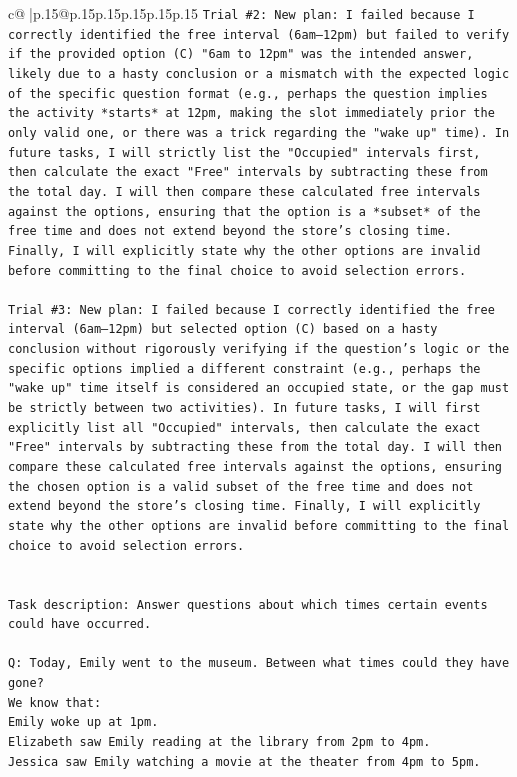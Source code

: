 \documentclass{article}
\begin{document}
{\begin{supertabular}{c@{$\;$}|p{.15\linewidth}@{}p{.15\linewidth}p{.15\linewidth}p{.15\linewidth}p{.15\linewidth}p{.15\linewidth}}
{{{\texttt{Trial \#2: New plan: I failed because I correctly identified the free interval (6am–12pm) but failed to verify if the provided option (C) "6am to 12pm" was the intended answer, likely due to a hasty conclusion or a mismatch with the expected logic of the specific question format (e.g., perhaps the question implies the activity *starts* at 12pm, making the slot immediately prior the only valid one, or there was a trick regarding the "wake up" time). In future tasks, I will strictly list the "Occupied" intervals first, then calculate the exact "Free" intervals by subtracting these from the total day. I will then compare these calculated free intervals against the options, ensuring that the option is a *subset* of the free time and does not extend beyond the store's closing time. Finally, I will explicitly state why the other options are invalid before committing to the final choice to avoid selection errors.} \\
\\ 
\texttt{Trial \#3: New plan: I failed because I correctly identified the free interval (6am–12pm) but selected option (C) based on a hasty conclusion without rigorously verifying if the question's logic or the specific options implied a different constraint (e.g., perhaps the "wake up" time itself is considered an occupied state, or the gap must be strictly between two activities). In future tasks, I will first explicitly list all "Occupied" intervals, then calculate the exact "Free" intervals by subtracting these from the total day. I will then compare these calculated free intervals against the options, ensuring the chosen option is a valid subset of the free time and does not extend beyond the store's closing time. Finally, I will explicitly state why the other options are invalid before committing to the final choice to avoid selection errors.} \\
\\ 
\\ 
\texttt{Task description: Answer questions about which times certain events could have occurred.} \\
\\ 
\texttt{Q: Today, Emily went to the museum. Between what times could they have gone?} \\
\texttt{We know that:} \\
\texttt{Emily woke up at 1pm.} \\
\texttt{Elizabeth saw Emily reading at the library from 2pm to 4pm.} \\
\texttt{Jessica saw Emily watching a movie at the theater from 4pm to 5pm.} \\
}}}
\end{supertabular}}
\end{document}

